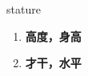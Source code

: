 
\begin{frame}
{\huge stature}
\begin{center}
\begin{enumerate}\Large
  \item \textbf{高度，身高}
  \item \textbf{才干，水平}
\end{enumerate}
\end{center}
\end{frame}
